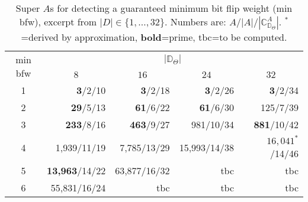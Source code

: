 \begin{table}[t!]
	\caption{Super \(A\)s for detecting a guaranteed minimum bit flip weight (min bfw), excerpt from \(|D|\in\{1,\dots,32\}\). Numbers are: \(A\)/\(|A|\)/\(|\mathbb{C}_{\mathbb{D}_\Theta}^A|\). \({}^*\)=derived by approximation, \textbf{bold}=prime, tbc=to be computed.}
	\label{tab:optimalAs}
	\vspace{-2mm}
	\centering
	\small
	\begin{tabular}{@{}c@{}rrrr@{}}
		\toprule
		\multirow{2}{*}[0.3mm]{\begin{minipage}{0.5cm}min bfw\end{minipage}} & \multicolumn{4}{c}{$|\mathbb{D}_\Theta|$} \\
		& \multicolumn{1}{c}{\(8\)}  & \multicolumn{1}{c}{\(16\)} & \multicolumn{1}{c}{\(24\)} & \multicolumn{1}{c}{\(32\)} \\
		\midrule
		1 & \textbf{3}/2/10       & \textbf{3}/2/18   & \textbf{3}/2/26  & \textbf{3}/2/34    \\
		2 & \textbf{29}/5/13      & \textbf{61}/6/22  & \textbf{61}/6/30 & 125/7/39           \\
		3 & \textbf{233}/8/16     & \textbf{463}/9/27 & 981/10/34        & \textbf{881}/10/42 \\
		4 & 1,939/11/19           & 7,785/13/29       & 15,993/14/38     & \(16,041^*\)/14/46 \\
		5 & \textbf{13,963}/14/22 & 63,877/16/32      & tbc              & tbc                \\
		6 & 55,831/16/24          & tbc               & tbc              & tbc                \\
		\bottomrule
	\end{tabular}
	\vspace{-0.4cm}
\end{table}


